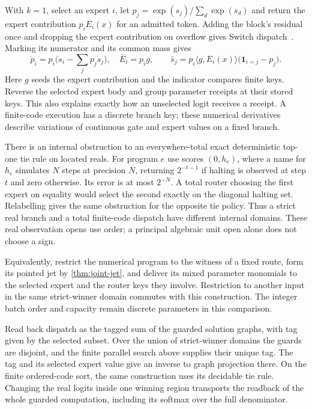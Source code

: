 \documentclass[11pt,a4paper]{article}
\theoremstyle{definition}
\theoremstyle{remark}\newaliascnt{remark}{theorem}
\numberwithin{equation}{section}
\begin{document}
With $k=1$, select an expert $i$, let $p_j=\exp(s_j)/\sum_d\exp(s_d)$ and return the expert contribution $p_i E_i(x)$ for an admitted token. Adding the block's residual once and dropping the expert contribution on overflow gives Switch dispatch~\cite{switch}. Marking its numerator and its common mass gives
\[
 \dot p_i=p_i\Big(\dot s_i-\sum_j p_j\dot s_j\Big),\quad
 \bar E_i=p_i g,\qquad
 \bar s_j=p_i\langle g,E_i(x)\rangle\big(\mathbf1_{i=j}-p_j\big).
\]
Here $g$ seeds the expert contribution and the indicator compares finite keys. Reverse the selected expert body and group parameter receipts at their stored keys. This also explains exactly how an unselected logit receives a receipt. A finite-code execution has a discrete branch key; these numerical derivatives describe variations of continuous gate and expert values on a fixed branch.

There is an internal obstruction to an everywhere-total exact deterministic top-one tie rule on located reals. For program $e$ use scores $(0,h_e)$, where a name for $h_e$ simulates $N$ steps at precision $N$, returning $2^{-t-1}$ if halting is observed at step $t$ and zero otherwise. Its error is at most $2^{-N}$. A total router choosing the first expert on equality would select the second exactly on the diagonal halting set. Relabelling gives the same obstruction for the opposite tie policy. Thus a strict real branch and a total finite-code dispatch have different internal domains. These real observation opens use order; a principal algebraic unit open alone does not choose a sign.

Equivalently, restrict the numerical program to the witness of a fixed route, form its pointed jet by \cref{thm:joint-jet}, and deliver its mixed parameter monomials to the selected expert and the router keys they involve. Restriction to another input in the same strict-winner domain commutes with this construction. The integer batch order and capacity remain discrete parameters in this comparison.

Read back dispatch as the tagged sum of the guarded solution graphs, with tag given by the selected subset. Over the union of strict-winner domains the guards are disjoint, and the finite parallel search above supplies their unique tag. The tag and its selected expert value give an inverse to graph projection there. On the finite ordered-code sort, the same construction uses its decidable tie rule. Changing the real logits inside one winning region transports the readback of the whole guarded computation, including its softmax over the full denominator.
\end{document}
